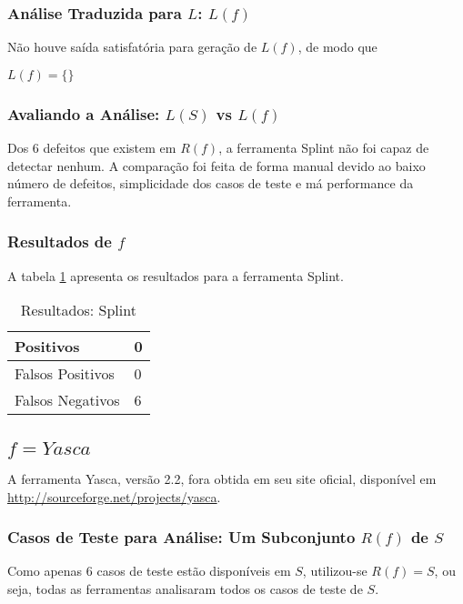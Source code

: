 \subsubsection{Análise Traduzida para $L$: $L(f)$}

Não houve saída satisfatória para geração de $L(f)$, de modo que 

$L(f) = \lbrace\rbrace$

\subsubsection{Avaliando a Análise: $L(S)$ vs $L(f)$}

Dos 6 defeitos que existem em $R(f)$, a ferramenta Splint não foi capaz de detectar nenhum. A comparação foi feita de forma manual devido ao baixo número de defeitos, simplicidade dos casos de teste e má performance da ferramenta.

\subsubsection{Resultados de $f$}

A tabela \ref{tabela_splint} apresenta os resultados para a ferramenta Splint.
\begin{table}[h]
  \centering
\begin{tabular}{| l | l |}
  \hline
  Positivos & 0 \\ \hline
  Falsos Positivos & 0 \\ \hline
  Falsos Negativos & 6 \\
  \hline
\end{tabular}
\caption{Resultados: Splint}
\label{tabela_splint}
\end{table}

\subsection{$f = Yasca$}

A ferramenta Yasca, versão 2.2, fora obtida em seu site oficial, disponível em \url{http://sourceforge.net/projects/yasca}.

\subsubsection{Casos de Teste para Análise: Um Subconjunto $R(f)$ de $S$}

Como apenas 6 casos de teste estão disponíveis em $S$, utilizou-se $R(f) = S$, ou seja, todas as ferramentas analisaram todos os casos de teste de $S$.

